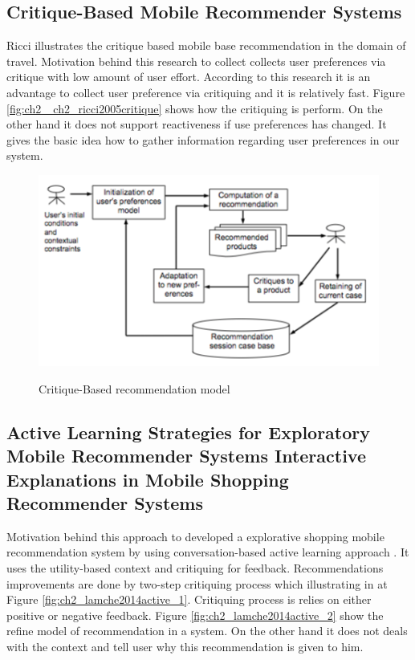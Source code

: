 \subsection{Critique-Based Mobile Recommender Systems}

Ricci \cite{ricci2005critique} illustrates the critique based  mobile base recommendation in the domain of travel. Motivation behind this research to collect collects user preferences via critique with low amount of user effort. According to this research it is an advantage to collect user preference via critiquing and it is relatively fast. Figure \ref{fig:ch2_ ch2_ricci2005critique} shows how the critiquing is perform. On the other hand it does not support reactiveness if  use preferences has changed. It gives the basic idea how to gather information regarding user preferences in our system. 
 
\begin{figure}[h]
	\centering
	\includegraphics[width=.70\linewidth]{figures/ch2_ricci2005critique.png}
	\caption{Critique-Based recommendation model}
	\cite{ricci2005critique}
	\label{fig:ch2_ricci2005critique}
\end{figure}


\subsection{Active Learning Strategies for Exploratory Mobile Recommender Systems Interactive Explanations in Mobile Shopping Recommender Systems}

Motivation behind this approach to developed a explorative shopping mobile recommendation system by using conversation-based active learning approach \cite{lamche2014active}. It uses the utility-based context and critiquing for feedback. Recommendations improvements are done by two-step critiquing process which illustrating in at Figure \ref{fig:ch2_lamche2014active_1}. Critiquing process is relies on either positive or negative feedback. Figure \ref{fig:ch2_lamche2014active_2} show the refine model of recommendation in a system. On the other hand it does not deals with the context and tell user why this recommendation is given to him. 

